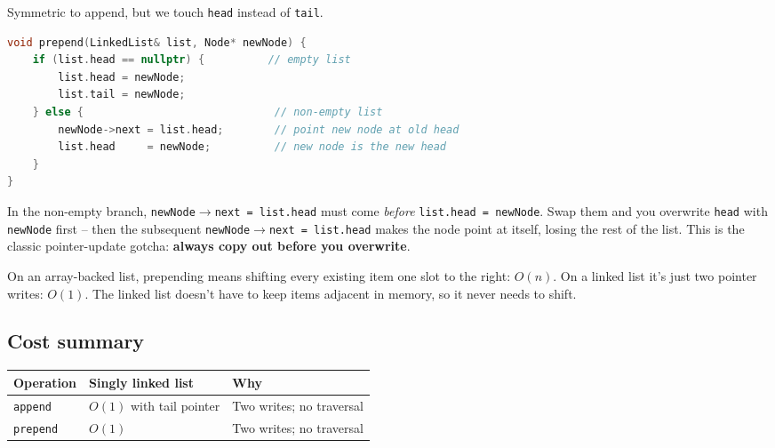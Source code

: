 \documentclass[11pt]{article}
\begin{document}
Symmetric to append, but we touch \texttt{head} instead of
\texttt{tail}.

\begin{examplebox}
\begin{lstlisting}[basicstyle=\ttfamily\small,frame=single,language=C++]
void prepend(LinkedList& list, Node* newNode) {
    if (list.head == nullptr) {          // empty list
        list.head = newNode;
        list.tail = newNode;
    } else {                              // non-empty list
        newNode->next = list.head;        // point new node at old head
        list.head     = newNode;          // new node is the new head
    }
}
\end{lstlisting}
\end{examplebox}

\begin{ideabox}
In the non-empty branch, \texttt{newNode$\to$next = list.head} must
come \emph{before} \texttt{list.head = newNode}. Swap them and you
overwrite \texttt{head} with \texttt{newNode} first -- then the
subsequent \texttt{newNode$\to$next = list.head} makes the node
point at itself, losing the rest of the list. This is the classic
pointer-update gotcha: \textbf{always copy out before you overwrite}.
\end{ideabox}

\begin{notebox}
On an array-backed list, prepending means shifting every existing
item one slot to the right: $O(n)$. On a linked list it's just two
pointer writes: $O(1)$. The linked list doesn't have to keep items
adjacent in memory, so it never needs to shift.
\end{notebox}

\subsection{Cost summary}

\begin{center}
\footnotesize
\renewcommand{\arraystretch}{1.3}
\begin{tabular}{@{}lll@{}}
\hline
\textbf{Operation}    & \textbf{Singly linked list} & \textbf{Why} \\
\hline
\texttt{append}       & $O(1)$ with tail pointer    & Two writes; no traversal \\
\texttt{prepend}      & $O(1)$                      & Two writes; no traversal \\
\hline
\end{tabular}
\end{center}
\end{document}
